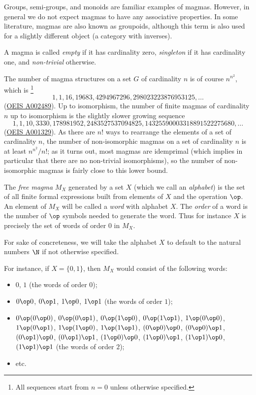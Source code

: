 Groups, semi-groups, and monoids are familiar examples of magmas. However, in general we do not expect magmas to have any associative properties. In some literature, magmas are also known as groupoids, although this term is also used for a slightly different object (a category with inverses).

A magma is called \emph{empty} if it has cardinality zero, \emph{singleton} if it has cardinality one, and \emph{non-trivial} otherwise.

The number of magma structures on a set $G$ of cardinality $n$ is of course $n^{n^2}$, which is \footnote{All sequences start from $n=0$ unless otherwise specified.}
$$ 1, 1, 16, 19683, 4294967296, 298023223876953125, \dots$$
(\href{https://oeis.org/A002489}{OEIS A002489}).
Up to isomorphism, the number of finite magmas of cardinality $n$ up to isomorphism is the slightly slower growing sequence
$$ 1, 1, 10, 3330, 178981952, 2483527537094825, 14325590003318891522275680, \dots$$
(\href{https://oeis.org/A001329}{OEIS A001329}).  As there are $n!$ ways to rearrange the elements of a set of cardinality $n$, the number of non-isomorphic magmas on a set of cardinality $n$ is at least $n^{n^2}/n!$; as it turns out, most magmas are idemprimal (which implies in particular that there are no non-trivial isomorphisms), so the number of non-isomorphic magmas is fairly close to this lower bound.

\begin{definition}\label{free-magma-def}\leanok{}
  The \emph{free magma} $M_X$ generated by a set $X$ (which we call an \emph{alphabet}) is the set of all finite formal expressions built from elements of $X$ and the operation $\op$.
  An element of $M_X$ will be called a \emph{word} with alphabet $X$.
  The \emph{order} of a word is the number of $\op$ symbols needed to generate the word.
  Thus for instance $X$ is precisely the set of words of order $0$ in $M_X$.
\end{definition}

For sake of concreteness, we will take the alphabet $X$ to default to the natural numbers $\N$ if not otherwise specified.

For instance, if $X = \{0,1\}$, then $M_X$ would consist of the following words:
\begin{itemize}
  \item $0$, $1$ (the words of order $0$);
  \item $0 \op 0$, $0 \op 1$, $1 \op 0$, $1 \op 1$ (the words of order $1$);
  \item $0 \op (0 \op 0)$, $0 \op (0 \op 1)$, $0 \op (1 \op 0)$, $0 \op (1 \op 1)$, $1 \op (0 \op 0)$, $1 \op (0 \op 1)$, $1 \op (1 \op 0)$, $1 \op (1 \op 1)$, $(0 \op 0) \op 0$, $(0 \op 0) \op 1$, $(0 \op 1) \op 0$, $(0 \op 1) \op 1$, $(1 \op 0) \op 0$, $(1 \op 0) \op 1$, $(1 \op 1) \op 0$, $(1 \op 1) \op 1$ (the words of order $2$);
  \item etc.
\end{itemize}

